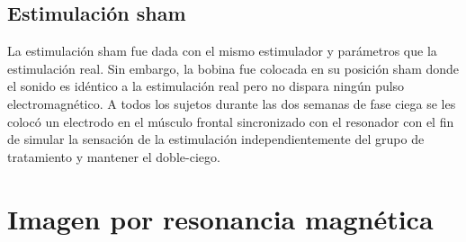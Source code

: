 \subsection{Estimulación sham}
La estimulación sham fue dada con el mismo estimulador y parámetros que la estimulación real. Sin embargo, la bobina fue colocada en su posición sham donde el sonido es idéntico a la estimulación real pero no dispara ningún pulso electromagnético.
A todos los sujetos durante las dos semanas de fase ciega se les colocó un electrodo en el músculo frontal sincronizado con el resonador con el fin de simular la sensación de la estimulación independientemente del grupo de tratamiento y mantener el doble-ciego.

\section{Imagen por resonancia magnética}
